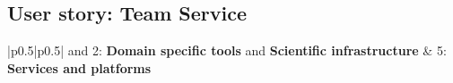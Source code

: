 \subsection{User story: Team Service}

\begin{center}
    \tabletail{\hline}
    \tablelasttail{\hline}
    \label{tab:rs_recc08}
    \small
    \begin{supertabular}{|p{0.5\linewidth}|p{0.5\linewidth}|}  and 2: \textbf{Domain specific tools} and \textbf{Scientific infrastructure} &
    5: \textbf{Services and platforms} \\ \hline \hline


\end{supertabular}
\end{center}
